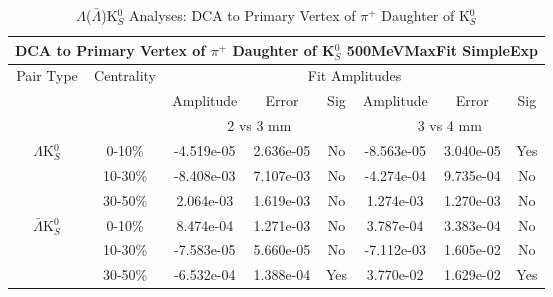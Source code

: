 \documentclass[../AnalysisNoteJBuxton.tex]{subfiles}
\begin{document}
\begin{table}
 \centering
 \begin{tabular}{|c|c|c|c|c||c|c|c|}
  \multicolumn{8}{c}{DCA to Primary Vertex of $\pi^{+}$ Daughter of K$^{0}_{S}$ 500MeVMaxFit SimpleExp} \\
  \hline
  \multirow{3}{*}{Pair Type} & \multirow{3}{*}{Centrality} & \multicolumn{6}{c|}{Fit Amplitudes} \\
  \cline{3-8}
   & & Amplitude & Error & Sig & Amplitude & Error & Sig \\  
  \cline{3-8}
   & & \multicolumn{3}{c||}{2 vs 3 mm} & \multicolumn{3}{c|}{3 vs 4 mm} \\  
  \hline  
  \multirow{3}{*}{$\Lambda$K$^{0}_{S}$}  
   &  0-10\% & -4.519e-05 & 2.636e-05 & No & -8.563e-05 & 3.040e-05 & Yes \\
   & 10-30\% & -8.408e-03 & 7.107e-03 & No & -4.274e-04 & 9.735e-04 & No \\
   & 30-50\% & 2.064e-03 & 1.619e-03 & No & 1.274e-03 & 1.270e-03 & No \\
  \hline  
  \multirow{3}{*}{$\bar{\Lambda}$K$^{0}_{S}$}  
   &  0-10\% & 8.474e-04 & 1.271e-03 & No & 3.787e-04 & 3.383e-04 & No \\
   & 10-30\% & -7.583e-05 & 5.660e-05 & No & -7.112e-03 & 1.605e-02 & No \\
   & 30-50\% & -6.532e-04 & 1.388e-04 & Yes & 3.770e-02 & 1.629e-02 & Yes \\
  \hline
 \end{tabular}
 \caption{$\Lambda$($\bar{\Lambda}$)K$^{0}_{S}$ Analyses: DCA to Primary Vertex of $\pi^{+}$ Daughter of K$^{0}_{S}$}
 \label{tab:DcaToPrimVertexPosPionDaughtOfK0LamK0_500MeVMaxFit_SimpleExp}
\end{table}



\end{document}
